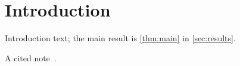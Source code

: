 \section{Introduction}
\label{sec:introduction}

Introduction text; the main result is \cref{thm:main} in \cref{sec:results}.

A cited note~\cite{Split2020}.
